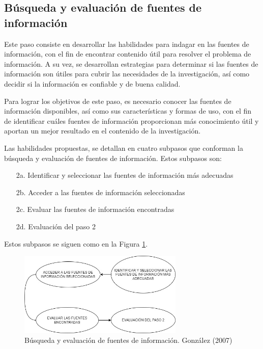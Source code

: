 
\subsection{Búsqueda y evaluación de fuentes de información}
\label{secPaso2Cap2}

Este paso consiste en desarrollar las habilidades para indagar en las fuentes de información, con el fin de encontrar contenido útil para resolver el problema de información. A su vez, se desarrollan estrategias para determinar si las fuentes de información son útiles para cubrir las necesidades de la investigación, así como decidir si la información es confiable y de buena calidad.

Para lograr los objetivos de este paso, es necesario conocer las fuentes de información disponibles, así como sus características y formas de uso, con el fin de identificar cuáles fuentes de información proporcionan más conocimiento útil y aportan un mejor resultado en el contenido de la investigación.

Las habilidades propuestas, se detallan en cuatro subpasos que conforman la búsqueda y evaluación de fuentes de información. Estos subpasos son:

\begin{itemize}
  \item [2a.] Identificar y seleccionar las fuentes de información más adecuadas
  \item [2b.] Acceder a las fuentes de información seleccionadas
  \item [2c.] Evaluar las fuentes de información encontradas
  \item [2d.] Evaluación del paso 2
\end{itemize}

Estos subpasos se siguen como en la Figura \ref{fig:24}.

\begin{figure}[H]
  \centering
  \includegraphics[width=0.70\textwidth]{Cap2/Figuras/Búsqueda y evaluación de información.jpg}
  \caption{Búsqueda y evaluación de fuentes de información. González (2007)}
  \label{fig:24}
\end{figure}

